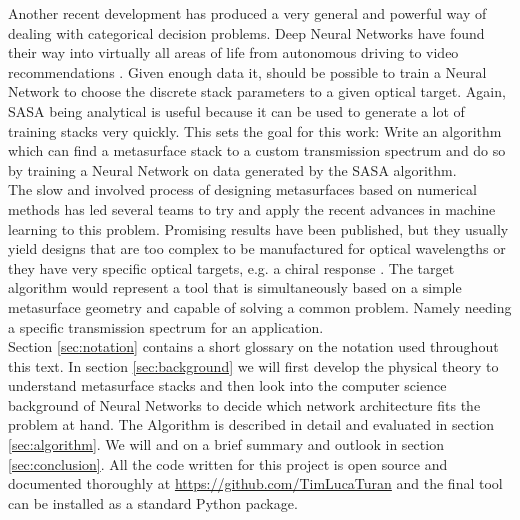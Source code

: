 \indent
Another recent development has produced a very general and powerful way of dealing with categorical decision problems. Deep Neural Networks have found their way into virtually all areas of life from autonomous driving \cite{Dequaire2016} to video recommendations \cite{youtube}. Given enough data it, should be possible to train a Neural Network to choose the discrete stack parameters to a given optical target.
Again, SASA being analytical is useful because it can be used to generate a lot of training stacks very quickly.
This sets the goal for this work: Write an algorithm which can find a metasurface stack to a custom transmission spectrum and do so by training a Neural Network on data generated by the SASA algorithm.
\\

\indent
The slow and involved process of designing metasurfaces based on numerical methods has led several teams to try and apply the recent advances in machine learning to this problem. Promising results have been published, but they usually yield designs that are too complex to be manufactured for optical wavelengths \cite{Fan2019} or they have very specific optical targets, e.g. a chiral response \cite{Ma2018}. The target algorithm would represent a tool that is simultaneously based on a simple metasurface geometry and capable of solving a common problem. Namely needing a specific transmission spectrum for an application.
\\

\indent
Section \ref{sec:notation} contains a short glossary on the notation used throughout this text.
In section \ref{sec:background} we will first develop the physical theory to understand metasurface stacks and then look into the computer science background of Neural Networks to decide which network architecture fits the problem at hand. 
The Algorithm is described in detail and evaluated in section \ref{sec:algorithm}. We will and on a brief summary and outlook in section \ref{sec:conclusion}.
All the code written for this project is open source and documented thoroughly at \url{https://github.com/TimLucaTuran} and the final tool can be installed as a standard Python package.
